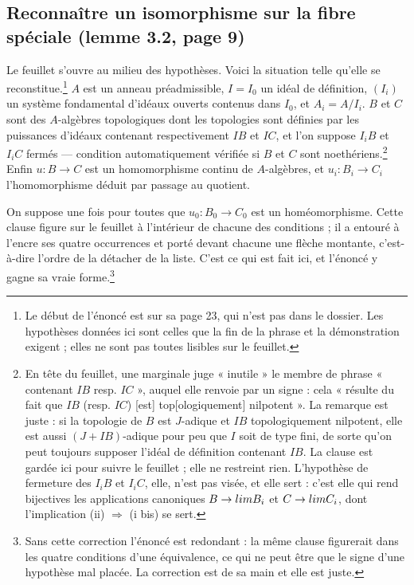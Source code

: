 \documentclass[11pt,a4paper]{article}
\begin{document}
\subsection*{Reconnaître un isomorphisme sur la fibre spéciale (lemme 3.2, page 9)}

Le feuillet s'ouvre au milieu des hypothèses. Voici la situation telle qu'elle
se reconstitue.\footnote{Le début de l'énoncé est sur sa page 23, qui n'est pas
dans le dossier. Les hypothèses données ici sont celles que la fin de la phrase
et la démonstration exigent ; elles ne sont pas toutes lisibles sur le
feuillet.} $A$ est un anneau préadmissible, $I = I_0$ un idéal de définition,
$(I_i)$ un système fondamental d'idéaux ouverts contenus dans $I_0$, et
$A_i = A/I_i$. $B$ et $C$ sont des $A$-algèbres topologiques dont les topologies
sont définies par les puissances d'idéaux contenant respectivement $IB$ et
$IC$, et l'on suppose $I_iB$ et $I_iC$ fermés — condition automatiquement
vérifiée si $B$ et $C$ sont noethériens.\footnote{En tête du feuillet, une
marginale juge « inutile » le membre de phrase « contenant $IB$ resp. $IC$ »,
auquel elle renvoie par un signe : cela « résulte du fait que $IB$ (resp.
$IC$) [est] top[ologiquement] nilpotent ». La remarque est juste : si la
topologie de $B$ est $J$-adique et $IB$ topologiquement nilpotent, elle est
aussi $(J + IB)$-adique pour peu que $I$ soit de type fini, de sorte qu'on peut toujours supposer l'idéal de
définition contenant $IB$. La clause est gardée ici pour suivre le feuillet ;
elle ne restreint rien. L'hypothèse de fermeture des $I_iB$ et $I_iC$, elle,
n'est pas visée, et elle sert : c'est elle qui rend bijectives les applications
canoniques $B \to \varprojlim B_i$ et $C \to \varprojlim C_i$, dont
l'implication (ii) $\Rightarrow$ (i bis) se sert.} Enfin $u : B \to C$ est un homomorphisme continu de $A$-algèbres, et
$u_i : B_i \to C_i$ l'homomorphisme déduit par passage au quotient.

On suppose une fois pour toutes que $u_0 : B_0 \to C_0$ est un homéomorphisme.
Cette clause figure sur le feuillet à l'intérieur de chacune des conditions ;
il a entouré à l'encre ses quatre occurrences et porté devant chacune une
flèche montante, c'est-à-dire l'ordre de la détacher de la liste. C'est ce qui
est fait ici, et l'énoncé y gagne sa vraie forme.\footnote{Sans cette
correction l'énoncé est redondant : la même clause figurerait dans les quatre
conditions d'une équivalence, ce qui ne peut être que le signe d'une hypothèse
mal placée. La correction est de sa main et elle est juste.}
\end{document}
